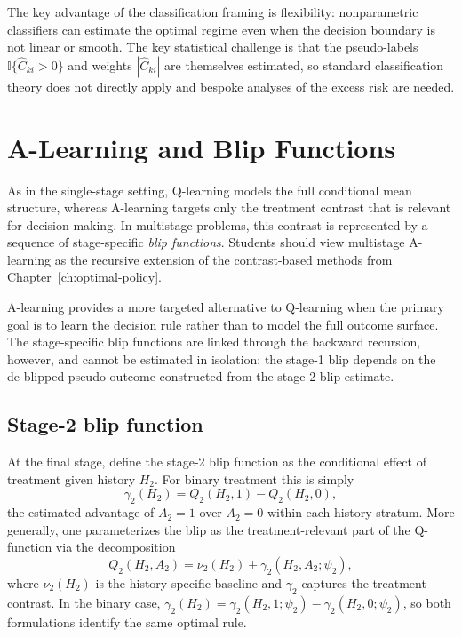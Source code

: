 \documentclass[master.tex]{subfiles}
\begin{document}
\begin{remark}
The key advantage of the classification framing is flexibility: nonparametric classifiers can estimate the optimal regime even when the decision boundary is not linear or smooth.  The key statistical challenge is that the pseudo-labels $\mathbb{I}\{\hat{C}_{ki}>0\}$ and weights $|\hat{C}_{ki}|$ are themselves estimated, so standard classification theory does not directly apply and bespoke analyses of the excess risk are needed.
\end{remark}

\section{A-Learning and Blip Functions}
\label{w15:sec:alearning}

As in the single-stage setting, Q-learning models the full conditional mean structure, whereas A-learning targets only the treatment contrast that is relevant for decision making. In multistage problems, this contrast is represented by a sequence of stage-specific \emph{blip functions}. Students should view multistage A-learning as the recursive extension of the contrast-based methods from Chapter~\ref{ch:optimal-policy}.

A-learning provides a more targeted alternative to Q-learning when the primary goal is to learn the decision rule rather than to model the full outcome surface. The stage-specific blip functions are linked through the backward recursion, however, and cannot be estimated in isolation: the stage-1 blip depends on the de-blipped pseudo-outcome constructed from the stage-2 blip estimate.

\subsection{Stage-2 blip function}

At the final stage, define the stage-2 blip function as the conditional effect of treatment given history $H_2$. For binary treatment this is simply
\[
\gamma_2(H_2) = Q_2(H_2,1) - Q_2(H_2,0),
\]
the estimated advantage of $A_2 = 1$ over $A_2 = 0$ within each history stratum. More generally, one parameterizes the blip as the treatment-relevant part of the Q-function via the decomposition
\[
Q_2(H_2,A_2)=\nu_2(H_2)+\gamma_2(H_2,A_2;\psi_2),
\]
where $\nu_2(H_2)$ is the history-specific baseline and $\gamma_2$ captures the treatment contrast. In the binary case, $\gamma_2(H_2) = \gamma_2(H_2,1;\psi_2) - \gamma_2(H_2,0;\psi_2)$, so both formulations identify the same optimal rule.
\end{document}
